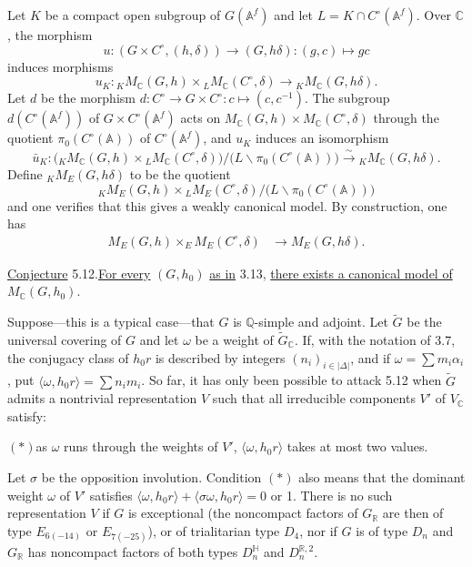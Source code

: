 \documentclass[10pt]{article}
\newcommand{\A}{\mathbb A}
\newcommand{\Af}{\mathbb A^f}
\newcommand{\C}{\mathbb C}
\newcommand{\Q}{\mathbb Q}
\newcommand{\R}{\mathbb R}
\newcommand{\MC}{M_{\C}}
\begin{document}
Let $K$ be a compact open subgroup of $G(\Af)$ and let $L=K\cap C^\circ(\Af)$. Over $\C$, the morphism
\[
u:(G\times C^\circ,(h,\delta))\longrightarrow(G,h\delta):(g,c)\longmapsto gc
\]
induces morphisms
\[
u_K:{}_K\MC(G,h)\times {}_L\MC(C^\circ,\delta)
 \longrightarrow {}_K\MC(G,h\delta).
\]
Let $d$ be the morphism $d:C^\circ\longrightarrow G\times C^\circ:c\longmapsto(c,c^{-1})$. The subgroup $d(C^\circ(\Af))$ of $G\times C^\circ(\Af)$ acts on $\MC(G,h)\times\MC(C^\circ,\delta)$ through the quotient $\pi_0(C^\circ(\A))$ of $C^\circ(\Af)$, and $u_K$ induces an isomorphism
\[
\bar u_K:\bigl({}_K\MC(G,h)\times{}_L\MC(C^\circ,\delta)\bigr)/
\bigl(L\backslash\pi_0(C^\circ(\A))\bigr)
\xrightarrow{\sim}{}_K\MC(G,h\delta).
\]
Define ${}_K M_E(G,h\delta)$ to be the quotient
\[
{}_K M_E(G,h)\times{}_L M_E(C^\circ,\delta)/
\bigl(L\backslash\pi_0(C^\circ(\A))\bigr)
\]
and one verifies that this gives a weakly canonical model. By construction, one has\begingroup\makeatletter
\tagsleft@true\makeatother
\begin{align}
M_E(G,h)\times_E M_E(C^\circ,\delta)&\longrightarrow M_E(G,h\delta). \tag{5.11.1}
\end{align}\endgroup

\noindent \uline{Conjecture} 5.12.\quad \uline{For every} $(G,h_0)$ \uline{as in} 3.13, \uline{there exists a canonical model of} $\MC(G,h_0)$.

Suppose---this is a typical case---that $G$ is $\Q$-simple and adjoint. Let $\widetilde G$ be the universal covering of $G$ and let $\omega$ be a weight of $\widetilde G_{\C}$. If, with the notation of 3.7, the conjugacy class of $h_0r$ is described by integers $(n_i)_{i\in|\Delta|}$, and if $\omega=\sum m_i\alpha_i$, put $\langle\omega,h_0r\rangle=\sum n_i m_i$. So far, it has only been possible to attack 5.12 when $\widetilde G$ admits a nontrivial representation $V$ such that all irreducible components $V'$ of $V_{\C}$ satisfy:

\noindent $(*)$\quad as $\omega$ runs through the weights of $V'$, $\langle\omega,h_0r\rangle$ takes at most two values.

Let $\sigma$ be the opposition involution. Condition $(*)$ also means that the dominant weight $\omega$ of $V'$ satisfies $\langle\omega,h_0r\rangle+\langle\sigma\omega,h_0r\rangle=0$ or 1. There is no such representation $V$ if $G$ is exceptional (the noncompact factors of $G_{\R}$ are then of type $E_{6(-14)}$ or $E_{7(-25)}$), or of trialitarian type $D_4$, nor if $G$ is of type $D_n$ and $G_{\R}$ has noncompact factors of both types $D_n^{\mathbb H}$ and $D_n^{\mathbb R,2}$.
\end{document}

